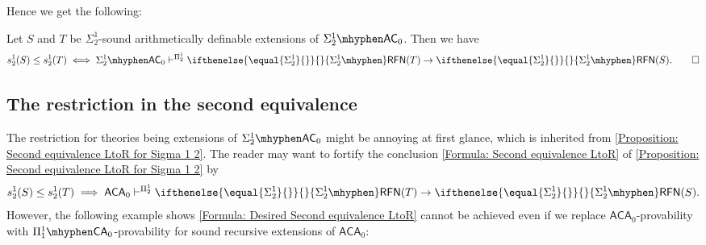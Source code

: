 \documentclass{mhkr}
\newcommand{\RFN}[1][]{\ifthenelse{\equal{#1}{}}{}{#1\mhyphen}\mathsf{RFN}}
\newcommand{\AC}{\mathsf{AC}}
\newcommand{\CA}{\mathsf{CA}}
\newcommand{\ACA}{\mathsf{ACA}}
\begin{document}
Hence we get the following:
\begin{corollary} \pushQED{\qed}
    Let $S$ and $T$ be $\Sigma^1_2$-sound arithmetically definable extensions of $\Sigma^1_2\mhyphen\AC_0$. Then we have
    \begin{equation*}
        s^1_2(S) \le s^1_2(T) \iff \Sigma^1_2\mhyphen\AC_0 \vdash^{\Pi^1_2} \RFN[\Sigma^1_2](T)\to\RFN[\Sigma^1_2](S). \qedhere 
    \end{equation*}
\end{corollary}

\subsection{The restriction in the second equivalence}
The restriction for theories being extensions of $\Sigma^1_2\mhyphen \AC_0$ might be annoying at first glance, which is inherited from \autoref{Proposition: Second equivalence LtoR for Sigma 1 2}. The reader may want to fortify the conclusion \eqref{Formula: Second equivalence LtoR} of \autoref{Proposition: Second equivalence LtoR for Sigma 1 2} by
\begin{equation} \label{Formula: Desired Second equivalence LtoR}
    s^1_2(S)\le s^1_2(T)\implies \ACA_0\vdash^{\Pi^1_2} \RFN[\Sigma^1_2](T)\to \RFN[\Sigma^1_2](S).
\end{equation}
However, the following example shows \eqref{Formula: Desired Second equivalence LtoR} cannot be achieved even if we replace $\ACA_0$-provability with $\Pi^1_1\mhyphen\CA_0$-provability for sound recursive extensions of $\ACA_0$:
\end{document}
